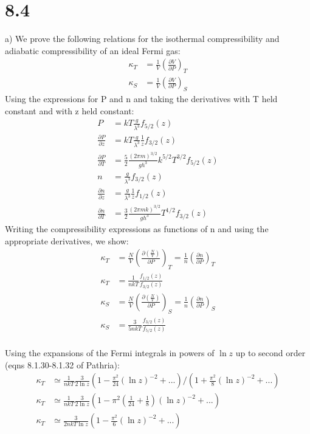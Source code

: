 \documentclass[a4paper,11pt]{article}
\numberwithin{equation}{section}
\begin{document}
\section{8.4}
a) We prove the following relations for the isothermal compressibility and adiabatic compressibility of an ideal Fermi gas:
\begin{align}
 \kappa_T &= \frac{1}{V}\left(\frac{\partial V}{\partial P}\right)_T\\
 \kappa_S &= \frac{1}{V}\left(\frac{\partial V}{\partial P}\right)_S
\end{align}
Using the expressions for P and n and taking the derivatives with T held constant and with z held constant:
\begin{align}
 P &= kT\frac{g}{\lambda^3}f_{5/2}(z)\\
 \frac{\partial P}{\partial z} &= kT\frac{g}{\lambda^3}\frac{1}{z}f_{3/2}(z)\\
 \frac{\partial P}{\partial T} &= \frac{5}{2}\frac{(2\pi m)^{3/2}}{gh^3}k^{5/2}T^{3/2}f_{5/2}(z)\\
 n &= \frac{g}{\lambda^3}f_{3/2}(z)\\
 \frac{\partial n}{\partial z} &= \frac{g}{\lambda^3}\frac{1}{z}f_{1/2}(z)\\
 \frac{\partial n}{\partial T} &= \frac{3}{2}\frac{(2\pi mk)^{3/2}}{gh^3}T^{1/2}f_{3/2}(z)
\end{align}
Writing the compressibility expressions as functions of n and using the appropriate derivatives, we show:
\begin{align}
 \kappa_T &= \frac{N}{V}\left(\frac{\partial (\frac{N}{V})}{\partial P}\right)_T
	      = \frac{1}{n}\left(\frac{\partial n}{\partial P}\right)_T\\
 \kappa_T &= \frac{1}{nkT}\frac{f_{1/2}(z)}{f_{3/2}(z)}\\
 \kappa_S &= \frac{N}{V}\left(\frac{\partial (\frac{N}{V})}{\partial P}\right)_S
	      = \frac{1}{n}\left(\frac{\partial n}{\partial P}\right)_S\\
 \kappa_S &= \frac{3}{5nkT}\frac{f_{3/2}(z)}{f_{5/2}(z)}
\end{align}
\\
Using the expansions of the Fermi integrals in powers of $\ln{z}$ up to second order (eqns 8.1.30-8.1.32 of Pathria):
\begin{align}
 \kappa_T &\simeq \frac{1}{nkT}\frac{3}{2\ln{z}}(1-\frac{\pi^2}{24}(\ln{z})^{-2}+...)/(1+\frac{\pi^2}{8}(\ln{z})^{-2}+...)\\
 \kappa_T &\simeq \frac{1}{nkT}\frac{3}{2\ln{z}}(1-\pi^2(\frac{1}{24}+\frac{1}{8})(\ln{z})^{-2}+...)\\
 \kappa_T &\simeq \frac{3}{2nkT\ln{z}}(1-\frac{\pi^2}{6}(\ln{z})^{-2}+...)
\end{align}
\end{document}
